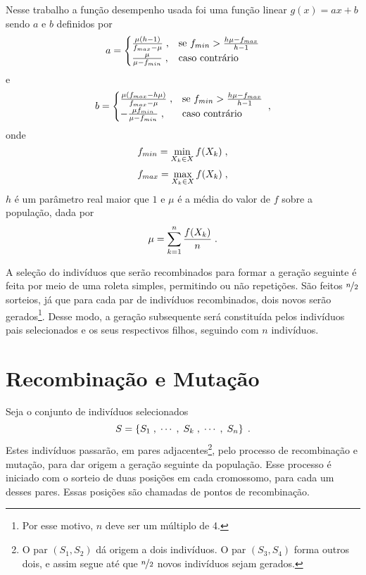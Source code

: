 Nesse trabalho a função desempenho usada foi uma função linear $ g(x) = ax + b $
sendo $a$ e $b$ definidos por
\begin{equation}
  a =
  \begin{cases}
    \frac{\mu (h - 1)}{f_{max} - \mu} \;, & \text{se } f_{min} > \frac{h\mu - f_{max}}{h - 1} \\
    \frac{\mu}{\mu - f_{min}}         \;, & \text{caso contrário}
  \end{cases}
  \label{eq:linear_fit_a}
\end{equation}
e
\begin{equation}
  b =
  \begin{cases}
    \frac{\mu (f_{max} - h\mu)}{f_{max} - \mu} \;, & \text{se } f_{min} > \frac{h\mu - f_{max}}{h - 1} \\
    - \frac{\mu f_{min}}{\mu - f_{min}}         \;, & \text{caso contrário}
  \end{cases}
  \;\mathrm{,}
  \label{eq:linear_fit_b}
\end{equation}
onde
\begin{equation}
  f_{min} = \min_{X_k \in X} f(X_k) \;\mathrm{,}
\end{equation}
\begin{equation}
  f_{max} = \max_{X_k \in X} f(X_k) \;\mathrm{,}
\end{equation}
$h$ é um parâmetro real maior que $1$ e $\mu$ é a média do valor de $f$ sobre a população, dada por
\begin{equation}
  \mu = \sum_{k = 1}^n \frac{f(X_k)}{n} \;\mathrm{.}
\end{equation}

A seleção do indivíduos que serão recombinados para formar a geração seguinte é feita por meio
de uma roleta simples, permitindo ou não repetições. São feitos $ \nicefrac{n}{2} $ sorteios,
já que para cada par de indivíduos recombinados, dois novos serão gerados\footnote{
  Por esse motivo, $n$ deve ser um múltiplo de 4.
}.
Desse modo, a geração subsequente será constituída pelos indivíduos pais selecionados e os seus
respectivos filhos, seguindo com $n$ indivíduos.

\section{Recombinação e Mutação}

Seja o conjunto de indivíduos selecionados
\begin{equation}
  S = \left\{ S_1\;, \;\cdots\;,  \;S_k\;, \;\cdots\;, \;S_n \right\} \;\mathrm{.}
  \label{eq:selection}
\end{equation}
Estes indivíduos passarão, em pares adjacentes\footnote{
  O par $ (S_1, S_2) $ dá origem a dois indivíduos. O par $ (S_3, S_4) $ forma outros dois, e assim segue
  até que $ \nicefrac{n}{2} $ novos indivíduos sejam gerados.
}, pelo processo de recombinação e mutação, para dar origem a
geração seguinte da população. Esse processo é iniciado com o sorteio de duas posições em cada cromossomo,
para cada um desses pares. Essas posições são chamadas de pontos de recombinação.

